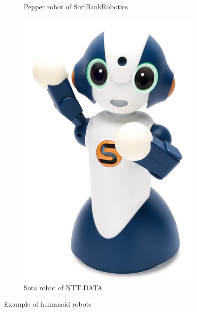 \documentclass{thesisreport}
\begin{document}
\begin{itemize}
\begin{figure}[H]
\begin{subfigure}{0.27\textwidth}
         \caption{\centering Pepper robot of SoftBankRobotics}
        \label{fig:pepper}
	\end{subfigure}
	\begin{subfigure}{0.27\textwidth}
		\includegraphics[width=\textwidth]{Thesis/data/sota.jpg}
		\caption{\centering Sota robot of NTT DATA }
		\label{fig:sota}
	\end{subfigure}
\caption{Example of humanoid robots}
\label{fig:humanoid}	
\end{figure}


\end{itemize}
\end{document}
